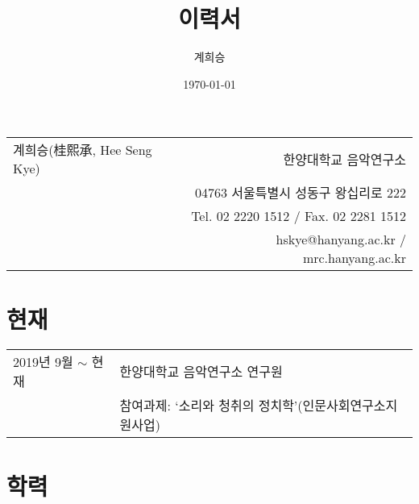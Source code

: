 \documentclass[dvipdfmx,a4paper]{article}
\title{이력서}
\author{계희승}
\date{\today}
\begin{document}
  \renewcommand{\headrulewidth}{0pt}
  \fancyhf{}
  \fancyfoot[RE,RO]{\small \thepage}
  
  \hspace*{-0.8cm}
  \begin{tabular}{p{7.6cm} r}
    {\large 계희승(桂熙承, Hee Seng Kye)} & 한양대학교 음악연구소\\
    & 04763 서울특별시 성동구 왕십리로 222\\
    & Tel. 02 2220 1512 / Fax. 02 2281 1512\\
    & hskye@hanyang.ac.kr / mrc.hanyang.ac.kr
  \end{tabular}
  
  \vspace{15mm}
  
  \section*{\normalsize 현재}
  
  \hspace*{-0.25cm}
  \begin{tabular}{p{4.0cm} l}
    2019년 9월 $\sim$ 현재 & 한양대학교 음악연구소 연구원\\
    & 참여과제: `소리와 청취의 정치학'(인문사회연구소지원사업)
  \end{tabular}
  
  \vspace*{2.5mm}
  
  \section*{\normalsize 학력}
  
\end{document}
